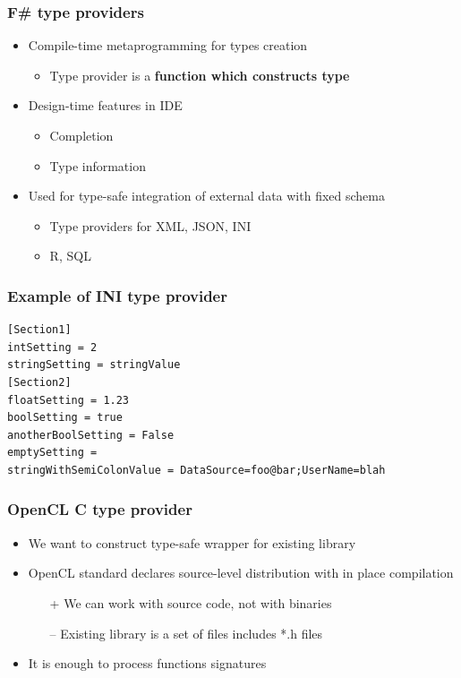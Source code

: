 \documentclass[xcolor=table]{beamer}
\begin{document}
\begin{frame}
  \transwipe[direction=90]
  \frametitle{F\# type providers}
\begin{itemize}
 \item Compile-time metaprogramming for types creation
 \begin{itemize}
  \item Type provider is a \textbf{function which constructs type}
 \end{itemize}
 \item Design-time features in IDE
 \begin{itemize}
   \item Completion
   \item Type information
 \end{itemize}
 \item Used for type-safe integration of external data with fixed schema
 \begin{itemize}
   \item Type providers for XML, JSON, INI
   \item R, SQL
 \end{itemize}
\end{itemize}

\end{frame}


\begin{frame}[fragile]
  \transwipe[direction=90]
  \frametitle{Example of INI type provider}

\small{
\begin{verbatim}
[Section1]
intSetting = 2
stringSetting = stringValue
[Section2]
floatSetting = 1.23
boolSetting = true
anotherBoolSetting = False
emptySetting =
stringWithSemiColonValue = DataSource=foo@bar;UserName=blah 
\end{verbatim}
}

\end{frame}

\begin{frame}
  \transwipe[direction=90]
  \frametitle{OpenCL C type provider}
\begin{itemize}
\item We want to construct type-safe wrapper for existing library
\item OpenCL standard declares source-level distribution with in place compilation
\begin{itemize}
\item[+] We can work with source code, not with binaries
\item[--] Existing library is a set of files includes *.h files
\end{itemize}
\item It is enough to process functions signatures
\end{itemize}
\end{frame}
 
\end{document}
